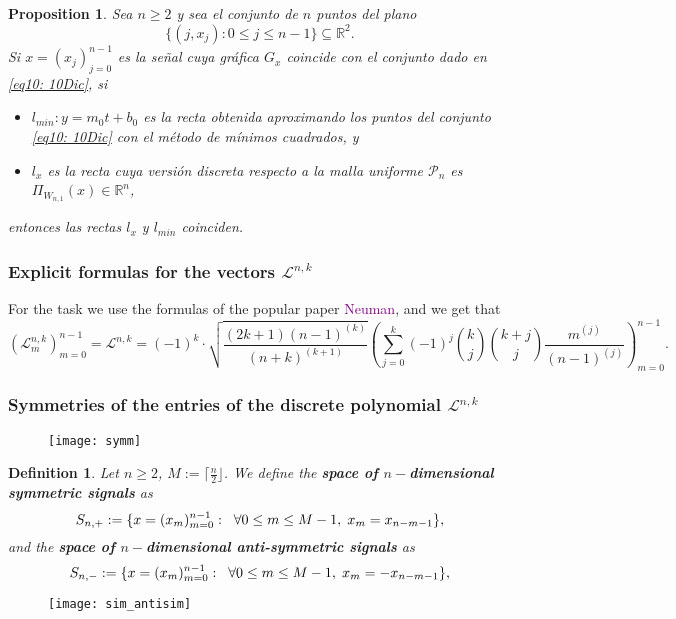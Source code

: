 \documentclass[]{beamer}
\newtheorem{prop}{\bf Proposition}
\newtheorem{defi}{\bf Definition}
\theoremstyle{definition}
\newcommand{\TODO}[1]{\textcolor{purple}{#1}}
\newcommand{\IR}{\mathbb{R}}
\newcommand{\suma}[3]{\sum\limits_{#1}^{#2}#3} %
\newcommand{\cali}[1]{\mathcal{#1}} %
\begin{document}
\begin{frame}
\begin{prop}
\label{prop: discretizacion recta minimos cuadrados}
Sea $n \geq 2$ y sea el conjunto de $n$ puntos del plano
\begin{equation}
\label{eq10: 10Dic}
\{(j, x_{j}): 0 \leq j \leq n-1 \}
\subseteq \IR^{2}.
\end{equation}
Si $x=(x_{j})_{j=0}^{n-1}$ es la señal cuya
gráfica $G_{x}$ coincide con el conjunto dado
en \eqref{eq10: 10Dic}, si
\begin{itemize}
\item $l_{min}: y= m_{0}t+ b_{0}$ es la recta obtenida 
aproximando los puntos del conjunto \eqref{eq10: 10Dic}
con el método de mínimos cuadrados, y

\item $l_{x}$ es la recta cuya versión discreta 
respecto a la malla uniforme $\cali{P}_{n}$
es $\Pi_{W_{n,1}}(x) \in \IR^{n}$, 

\end{itemize} 
entonces las rectas $l_{x}$ y $l_{min}$ coinciden.
\end{prop}
\end{frame}


\begin{frame}
\frametitle{Explicit formulas for the vectors $\cali{L}^{n,k}$}

For the task we use the formulas of the popular paper
\TODO{Neuman}, and we get that
\[
(\cali{L}_{m}^{n,k})_{m=0}^{n-1}
= \cali{L}^{n,k}
= (-1)^{k} \cdot 
\sqrt{\frac{(2k+1)(n-1)^{(k)}}{(n+k)^{(k+1)}}}
\left(
\suma{j=0}{k}{(-1)^{j}\binom{k}{j}\binom{k+j}{j}
\frac{m^{(j)}}{(n-1)^{(j)}}}
\right)_{m=0}^{n-1}.
\]
\end{frame}


\begin{frame}
\frametitle{Symmetries of the entries of the discrete polynomial $\cali{L}^{n,k}$}

\begin{figure}[h]
\texttt{[image: symm]}
\end{figure}
\end{frame}


\begin{frame}
\begin{defi}
Let $n \geq 2$, $M := \lceil \frac{n}{2} \rfloor$. We define the
\textbf{space of $n-$dimensional symmetric signals} as
\[
S_{n, +} := \{ x = (x_{m})_{m=0}^{n-1} : \hspace{0.2cm} 
\forall 0 \leq m \leq M-1, \hspace{0.1cm} x_{m} = x_{n-m-1} \},
\]
and the \textbf{space of $n-$dimensional anti-symmetric signals} as
\[
S_{n, -} := \{ x = (x_{m})_{m=0}^{n-1} : \hspace{0.2cm} 
\forall 0 \leq m \leq M-1, \hspace{0.1cm} x_{m} = -x_{n-m-1} \},
\]
\end{defi}
\begin{figure}[h]
\texttt{[image: sim\_antisim]}
\end{figure}
\end{frame}
\end{document}
